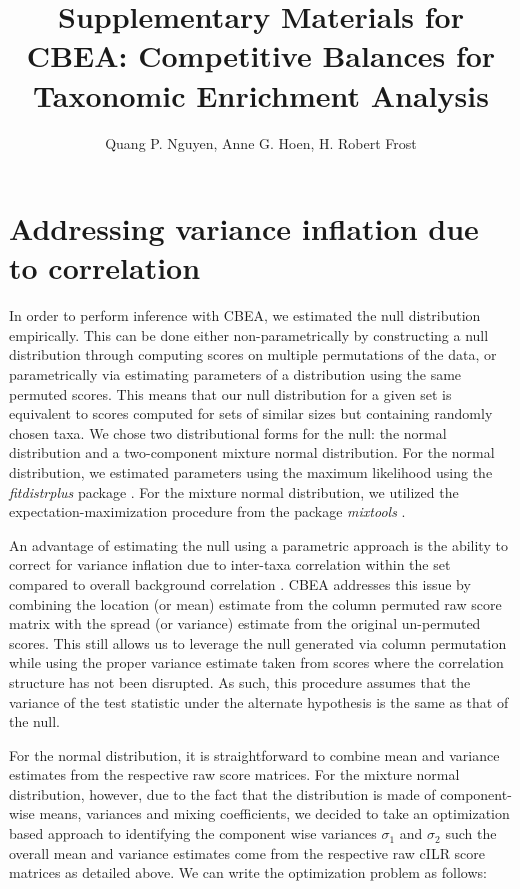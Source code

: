 \documentclass{article}
\title{Supplementary Materials for CBEA: Competitive Balances for Taxonomic Enrichment Analysis}
\begin{document}
\author{Quang P. Nguyen, Anne G. Hoen, H. Robert Frost}
\maketitle
{}


\section{Addressing variance inflation due to correlation}

In order to perform inference with CBEA, we estimated the null distribution empirically. This can be done either non-parametrically by constructing a null distribution through computing scores on multiple permutations of the data, or parametrically via estimating parameters of a distribution using the same permuted scores. This means that our null distribution for a given set is equivalent to scores computed for sets of similar sizes but containing randomly chosen taxa. We chose two distributional forms for the null: the normal distribution and a two-component mixture normal distribution. For the normal distribution, we estimated parameters using the maximum likelihood using the \emph{fitdistrplus} package \cite{delignette-muller2015}. For the mixture normal distribution, we utilized the expectation-maximization procedure from the package \emph{mixtools} \cite{benaglia2009}. 

An advantage of estimating the null using a parametric approach is the ability to correct for variance inflation due to inter-taxa correlation within the set compared to overall background correlation \cite{wu2012}. CBEA addresses this issue by combining the location (or mean) estimate from the column permuted raw score matrix with the spread (or variance) estimate from the original un-permuted scores. This still allows us to leverage the null generated via column permutation while using the proper variance estimate taken from scores where the correlation structure has not been disrupted. As such, this procedure assumes that the variance of the test statistic under the alternate hypothesis is the same as that of the null.  

For the normal distribution, it is straightforward to combine mean and variance estimates from the respective raw score matrices. For the mixture normal distribution, however, due to the fact that the distribution is made of component-wise means, variances and mixing coefficients, we decided to take an optimization based approach to identifying the component wise variances $\sigma_1$ and $\sigma_2$ such the overall mean and variance estimates come from the respective raw cILR score matrices as detailed above. We can write the optimization problem as follows: 
\end{document}
